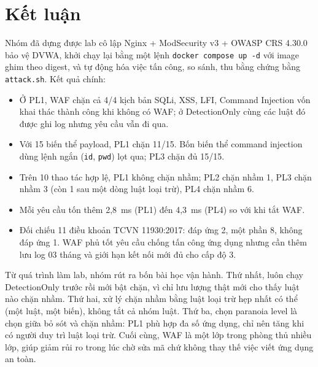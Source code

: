 \section{Kết luận}
Nhóm đã dựng được lab cô lập Nginx + ModSecurity v3 + OWASP CRS 4.30.0 bảo vệ DVWA, khởi chạy lại bằng một lệnh \texttt{docker compose up -d} với image ghim theo digest, và tự động hóa việc tấn công, so sánh, thu bằng chứng bằng \texttt{attack.sh}. Kết quả chính:
\begin{itemize}
  \item Ở PL1, WAF chặn cả 4/4 kịch bản SQLi, XSS, LFI, Command Injection vốn khai thác thành công khi không có WAF; ở DetectionOnly cùng các luật đó được ghi log nhưng yêu cầu vẫn đi qua.
  \item Với 15 biến thể payload, PL1 chặn 11/15. Bốn biến thể command injection dùng lệnh ngắn (\texttt{id}, \texttt{pwd}) lọt qua; PL3 chặn đủ 15/15.
  \item Trên 10 thao tác hợp lệ, PL1 không chặn nhầm; PL2 chặn nhầm 1, PL3 chặn nhầm 3 (còn 1 sau một dòng luật loại trừ), PL4 chặn nhầm 6.
  \item Mỗi yêu cầu tốn thêm 2,8~ms (PL1) đến 4,3~ms (PL4) so với khi tắt WAF.
  \item Đối chiếu 11 điều khoản TCVN 11930:2017: đáp ứng 2, một phần 8, không đáp ứng 1. WAF phủ tốt yêu cầu chống tấn công ứng dụng nhưng cần thêm lưu log 03 tháng và giới hạn kết nối mới đủ cho cấp độ 3.
\end{itemize}

Từ quá trình làm lab, nhóm rút ra bốn bài học vận hành. Thứ nhất, luôn chạy DetectionOnly trước rồi mới bật chặn, vì chỉ lưu lượng thật mới cho thấy luật nào chặn nhầm. Thứ hai, xử lý chặn nhầm bằng luật loại trừ hẹp nhất có thể (một luật, một biến), không tắt cả nhóm luật. Thứ ba, chọn paranoia level là chọn giữa bỏ sót và chặn nhầm: PL1 phù hợp đa số ứng dụng, chỉ nên tăng khi có người duy trì luật loại trừ. Cuối cùng, WAF là một lớp trong phòng thủ nhiều lớp, giúp giảm rủi ro trong lúc chờ sửa mã chứ không thay thế việc viết ứng dụng an toàn.
